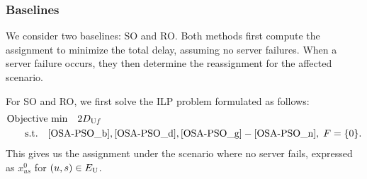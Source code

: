 \documentclass[10pt, letterpaper]{IEEEtran}
\begin{document}
\begin{CJK}{UTF8}{ipxm}
\subsubsection{Baselines}
We consider two baselines: SO and RO.
Both methods first compute the assignment to minimize the total delay, assuming no server failures.
When a server failure occurs, they then determine the reassignment for the affected scenario.

For SO and RO, we first solve the ILP problem formulated as follows:
\begin{subequations} \label{OSA-SO-f0}
  \begin{align}
  \text{Objective}&\text{ min}\quad 2D_{\mathrm{U}f} \label{OSA-SO-f0_a} \\
  \rm{s.t.} \quad
  & \eqref{OSA-PSO_b}, \eqref{OSA-PSO_d}, \eqref{OSA-PSO_g}-\eqref{OSA-PSO_n}, \; F = \{0\}. \label{OSA-SO-f0_b}
  \end{align}
\end{subequations}
This gives us the assignment under the scenario where no server fails, expressed as $x^0_{us}$ for $(u,s) \in E_{\rm{U}}$.


\end{CJK}
\end{document}
